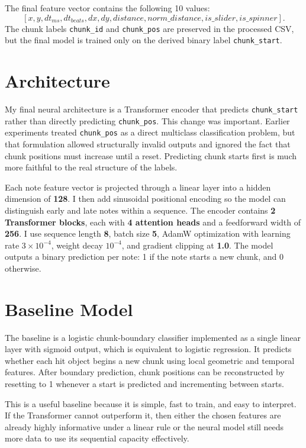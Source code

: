 \documentclass[final]{article}
\begin{document}
The final feature vector contains the following 10 values:
\[
[x, y, dt_{ms}, dt_{beats}, dx, dy, distance, norm\_distance, is\_slider, is\_spinner].
\]
The chunk labels \texttt{chunk\_id} and \texttt{chunk\_pos} are preserved in the processed CSV, but the final model is trained only on the derived binary label \texttt{chunk\_start}.

\section*{Architecture}
My final neural architecture is a Transformer encoder that predicts \texttt{chunk\_start} rather than directly predicting \texttt{chunk\_pos}. This change was important. Earlier experiments treated \texttt{chunk\_pos} as a direct multiclass classification problem, but that formulation allowed structurally invalid outputs and ignored the fact that chunk positions must increase until a reset. Predicting chunk starts first is much more faithful to the real structure of the labels.

Each note feature vector is projected through a linear layer into a hidden dimension of \textbf{128}. I then add sinusoidal positional encoding so the model can distinguish early and late notes within a sequence. The encoder contains \textbf{2 Transformer blocks}, each with \textbf{4 attention heads} and a feedforward width of \textbf{256}. I use sequence length \textbf{8}, batch size \textbf{5}, AdamW optimization with learning rate \textbf{$3\times10^{-4}$}, weight decay \textbf{$10^{-4}$}, and gradient clipping at \textbf{1.0}. The model outputs a binary prediction per note: 1 if the note starts a new chunk, and 0 otherwise.

\section*{Baseline Model}
The baseline is a logistic chunk-boundary classifier implemented as a single linear layer with sigmoid output, which is equivalent to logistic regression. It predicts whether each hit object begins a new chunk using local geometric and temporal features. After boundary prediction, chunk positions can be reconstructed by resetting to 1 whenever a start is predicted and incrementing between starts.

This is a useful baseline because it is simple, fast to train, and easy to interpret. If the Transformer cannot outperform it, then either the chosen features are already highly informative under a linear rule or the neural model still needs more data to use its sequential capacity effectively.
\end{document}
